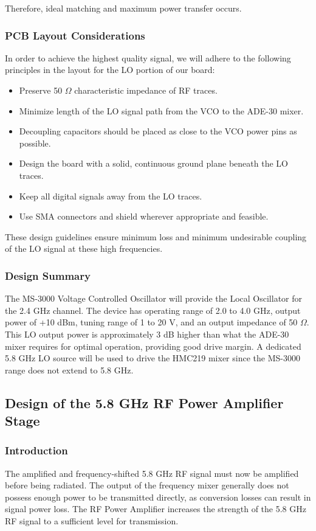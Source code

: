 \documentclass[12pt,a4paper]{report}
\begin{document}
	Therefore, ideal matching and maximum power transfer occurs.
	
	\subsubsection{PCB Layout Considerations}
	In order to achieve the highest quality signal, we will adhere to the following principles in the layout for the LO portion of our board:
	\begin{itemize}
		\item Preserve 50 $\Omega$ characteristic impedance of RF traces.
		\item Minimize length of the LO signal path from the VCO to the ADE-30 mixer.
		\item Decoupling capacitors should be placed as close to the VCO power pins as possible.
		\item Design the board with a solid, continuous ground plane beneath the LO traces.
		\item Keep all digital signals away from the LO traces.
		\item Use SMA connectors and shield wherever appropriate and feasible.
	\end{itemize}
	
	These design guidelines ensure minimum loss and minimum undesirable coupling of the LO signal at these high frequencies.
	\subsubsection{Design Summary}
	The MS-3000 Voltage Controlled Oscillator will provide the Local Oscillator for the 2.4 GHz channel. The device has operating range of 2.0 to 4.0 GHz, output power of +10 dBm, tuning range of 1 to 20 V, and an output impedance of 50 $\Omega$. This LO output power is approximately 3 dB higher than what the ADE-30 mixer requires for optimal operation, providing good drive margin. A dedicated 5.8 GHz LO source will be used to drive the HMC219 mixer since the MS-3000 range does not extend to 5.8 GHz.
	\subsection{Design of the 5.8 GHz RF Power Amplifier Stage}
	
	\subsubsection{Introduction}
	The amplified and frequency-shifted 5.8 GHz RF signal must now be amplified before being radiated. The output of the frequency mixer generally does not possess enough power to be transmitted directly, as conversion losses can result in signal power loss. The RF Power Amplifier increases the strength of the 5.8 GHz RF signal to a sufficient level for transmission.
	
\end{document}
